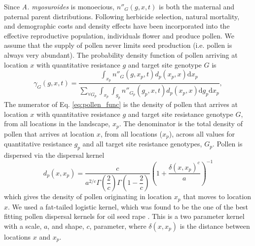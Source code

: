 \documentclass[10pt,letterpaper]{article}
\begin{document}
Since \textit{A. myosuroides} is monoecious, $n''_G(g, x, t)$ is both the maternal and paternal parent distributions. Following herbicide selection, natural mortality, and demographic costs and density effects have been incorporated into the effective reproductive population, individuals flower and produce pollen. We assume that the supply of pollen never limits seed production (i.e. pollen is always very abundant). The probability density function of pollen arriving at location $x$ with quantitative resistance $g$ and target site genotype $G$ is 
\begin{equation}\label{eq:pollen_func}
\gamma_G(g, x, t) = \frac{\int_{x_p} n''_G(g, x_p, t)d_p(x_p, x)\text{d}x_p} {\sum_{\forall G_p}\int_{x_p}\int_{g_p} n''_{G_p}(g_p, x, t) d_p(x_p, x)\text{d}g_p \text{d}x_p}, 
\end{equation}
The numerator of Eq. \ref{eq:pollen_func} is the density of pollen that arrives at location $x$ with quantitative resistance $g$ and target site resistance genotype $G$, from all locations in the landscape, $x_p$. The denominator is the total density of pollen that arrives at location $x$, from all locations ($x_p$), across all values for quantitative resistance $g_p$ and all target site resistance genotypes, $G_p$. Pollen is dispersed via the dispersal kernel  
\begin{equation}\label{eq:pollen_disp}
	d_p(x, x_p) = \frac{c}{a^{2/c}\Gamma\left(\dfrac{2}{c} \right)\Gamma\left(1 - \dfrac{2}{c} \right)}{\left( 1 + \dfrac{\delta(x, x_p)^c}{a} \right)}^{-1} 
\end{equation} 
which gives the density of pollen originating in location $x_p$ that moves to location $x$. We used a fat-tailed logistic kernel, which was found to be the one of the best fitting pollen dispersal kernels for oil seed rape \cite{Klei2006}. This is a two parameter kernel with a scale, $a$, and shape, $c$, parameter, where $\delta(x,x_p)$ is the distance between locations $x$ and $x_p$. 
\end{document}
